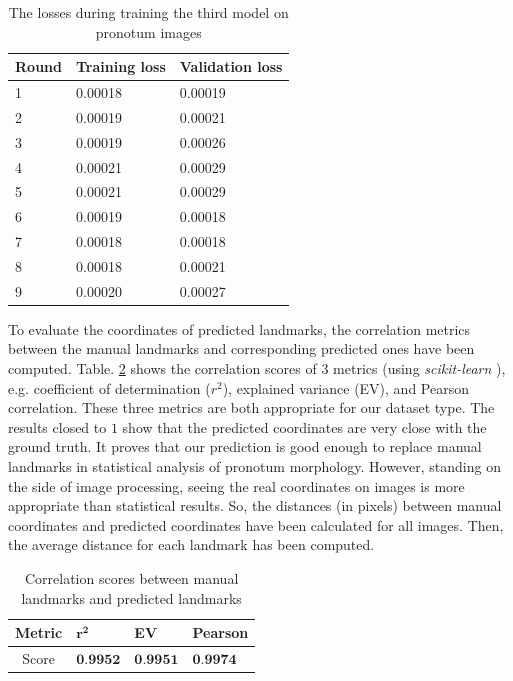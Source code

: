 \documentclass[review]{elsarticle}
\begin{document}
\begin{table}[h!]
	\centering
	\begin{tabular}{l l l}
	Round & Training loss & Validation loss \\ \hline
	1 & 0.00018 & 0.00019  \\ \hline
	2 & 0.00019 & 0.00021 \\ \hline
	3 & 0.00019 & 0.00026 \\ \hline
	4 & 0.00021 & 0.00029 \\ \hline
	5 & 0.00021 & 0.00029 \\ \hline
	6 & 0.00019 & 0.00018 \\ \hline
	7 & 0.00018 & 0.00018 \\ \hline
	8 & 0.00018 & 0.00021 \\ \hline
	9 & 0.00020 & 0.00027 \\ \hline
	\end{tabular}
	\caption{\small{The losses during training the third model on pronotum images}}
	\label{tbltrainingloss}
\end{table}

To evaluate the coordinates of predicted landmarks, the correlation metrics between the manual landmarks and corresponding predicted ones have been computed. Table. \ref{tblcorrelation} shows the correlation scores of $3$ metrics (using \textit{scikit-learn} \cite{pedregosa2011scikit}), e.g. coefficient of determination ($r^2$), explained variance (EV), and Pearson correlation. These three metrics are both appropriate for our dataset type. The results closed to $1$ show that the predicted coordinates are very close with the ground truth. It proves that our prediction is good enough to replace manual landmarks in statistical analysis of pronotum morphology. However, standing on the side of image processing, seeing the real coordinates on images is more appropriate than statistical results. So, the distances (in pixels) between manual coordinates and predicted coordinates have been calculated for all images. Then, the average distance for each landmark has been computed.

\begin{table}[htbp]
	\centering
	\begin{tabular}{|c|p{2cm}|p{2cm}|p{2cm}|}
		Metric & $\mathbf{r^{2}}$ & \textbf{EV} & \textbf{Pearson} \\ \hline
		Score & $\textbf{0.9952}$ & $\textbf{0.9951}$ & $\textbf{0.9974}$ 
	\end{tabular}
	\caption{Correlation scores between manual landmarks and predicted landmarks}
	\label{tblcorrelation}
\end{table}
\end{document}
